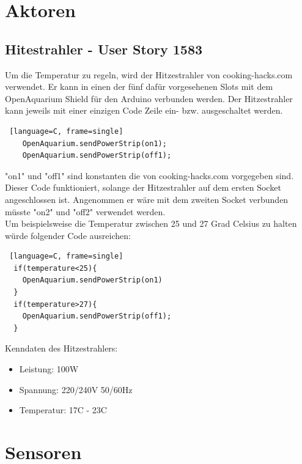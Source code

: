 \documentclass[11pt]{article}
\begin{document}
\newpage
\section{Aktoren}
\subsection{Hitestrahler - User Story 1583}
Um die Temperatur zu regeln, wird der Hitzestrahler von cooking-hacks.com verwendet. Er kann in einen der fünf dafür vorgesehenen Slots mit dem OpenAquarium Shield für den Arduino verbunden werden. Der Hitzestrahler kann jeweils mit einer einzigen Code Zeile ein- bzw. ausgeschaltet werden.
\begin{lstlisting} [language=C, frame=single]
	OpenAquarium.sendPowerStrip(on1); 
	OpenAquarium.sendPowerStrip(off1);
\end{lstlisting}
"on1" und "off1" sind konstanten die von cooking-hacks.com vorgegeben sind.
Dieser Code funktioniert, solange der Hitzestrahler auf dem ersten Socket angeschlossen ist. Angenommen er wäre mit dem zweiten Socket verbunden müsste "on2" und "off2" verwendet werden. \\
Um beispielsweise die Temperatur zwischen 25 und 27 Grad Celsius zu halten würde folgender Code ausreichen:
\begin{lstlisting} [language=C, frame=single]
  if(temperature<25){ 
    OpenAquarium.sendPowerStrip(on1)
  }
  if(temperature>27){ 
    OpenAquarium.sendPowerStrip(off1);
  }
\end{lstlisting}
Kenndaten des Hitzestrahlers:
\begin{itemize}
\item Leistung: 100W
\item Spannung: 220/240V 50/60Hz
\item Temperatur: 17\degree C - 23\degree C
\end{itemize}

\newpage
\section{Sensoren}
\end{document}
